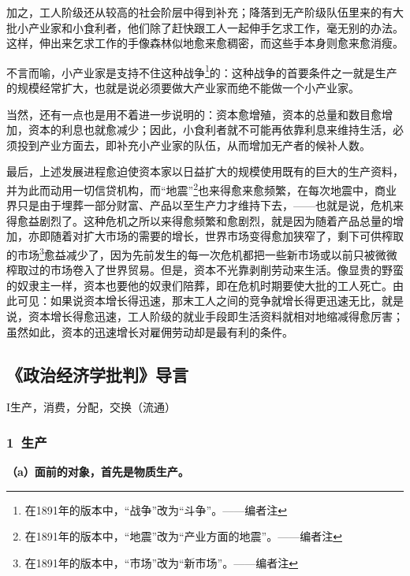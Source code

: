 \documentclass[a4paper,twoside,12pt,AutoFakeBold]{ctexart}
\begin{document}
加之，工人阶级还从较高的社会阶层中得到补充；降落到无产阶级队伍里来的有大批小产业家和小食利者，他们除了赶快跟工人一起伸手乞求工作，毫无别的办法。这样，伸出来乞求工作的手像森林似地愈来愈稠密，而这些手本身则愈来愈消瘦。

不言而喻，小产业家是支持不住这种战争\footnote{在1891年的版本中，“战争”改为“斗争”。——编者注}的：这种战争的首要条件之一就是生产的规模经常扩大，也就是说必须要做大产业家而绝不能做一个小产业家。

当然，还有一点也是用不着进一步说明的：资本愈增殖，资本的总量和数目愈增加，资本的利息也就愈减少；因此，小食利者就不可能再依靠利息来维持生活，必须投到产业方面去，即补充小产业家的队伍，从而增加无产者的候补人数。

最后，上述发展进程愈迫使资本家以日益扩大的规模使用既有的巨大的生产资料，并为此而动用一切信贷机构，而“地震”\footnote{在1891年的版本中，“地震”改为“产业方面的地震”。——编者注}也来得愈来愈频繁，在每次地震中，商业界只是由于埋葬一部分财富、产品以至生产力才维持下去，——也就是说，危机来得愈益剧烈了。这种危机之所以来得愈频繁和愈剧烈，就是因为随着产品总量的增加，亦即随着对扩大市场的需要的增长，世界市场变得愈加狭窄了，剩下可供榨取的市场\footnote{在1891年的版本中，“市场”改为“新市场”。——编者注}愈益减少了，因为先前发生的每一次危机都把一些新市场或以前只被微微榨取过的市场卷入了世界贸易。但是，资本不光靠剥削劳动来生活。像显贵的野蛮的奴隶主一样，资本也要他的奴隶们陪葬，即在危机时期要使大批的工人死亡。由此可见：如果说资本增长得迅速，那末工人之间的竞争就增长得更迅速无比，就是说，资本增长得愈迅速，工人阶级的就业手段即生活资料就相对地缩减得愈厉害；虽然如此，资本的迅速增长对雇佣劳动却是最有利的条件。

\newpage

\subsection{《政治经济学批判》导言}
\begin{center}
 I生产，消费，分配，交换（流通）    
\end{center}
\subsubsection{1~生产}

\textbf{（a）面前的对象，首先是物质生产。}
\end{document}
